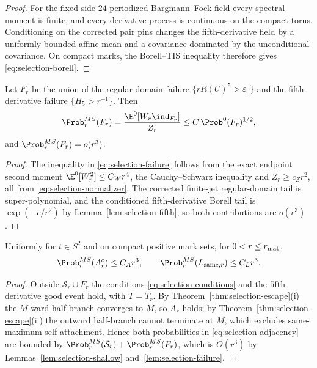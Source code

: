 \begin{proof}
For the fixed side-$24$ periodized Bargmann--Fock field every spectral moment is finite, and every derivative process is continuous on the compact torus. Conditioning on the corrected pair pins changes the fifth-derivative field by a uniformly bounded affine mean and a covariance dominated by the unconditional covariance. On compact marks, the Borell--TIS inequality \cite{AdlerTaylor} therefore gives \eqref{eq:selection-borell}.
\end{proof}

\begin{lemma}\label{lem:selection-failure}
Let $F_r$ be the union of the regular-domain failure $\{rR(U)^5>\varepsilon_0\}$ and the fifth-derivative failure $\{H_5>r^{-1}\}$. Then
\begin{equation}\label{eq:selection-failure}
\Prob^{MS}_r(F_r)=\frac{\E^0[W_r\ind_{F_r}]}{Z_r}\le C\,\Prob^0(F_r)^{1/2},
\end{equation}
and $\Prob^{MS}_r(F_r)=o(r^3)$.
\end{lemma}

\begin{proof}
The inequality in \eqref{eq:selection-failure} follows from the exact endpoint second moment $\E^0[W_r^2]\le C_Wr^4$, the Cauchy--Schwarz inequality and $Z_r\ge c_Zr^2$, all from \eqref{eq:selection-normalizer}. The corrected finite-jet regular-domain tail is super-polynomial, and the conditioned fifth-derivative Borell tail is $\exp(-c/r^2)$ by Lemma~\ref{lem:selection-fifth}, so both contributions are $o(r^3)$.
\end{proof}

\begin{proposition}\label{prop:selection-adjacency}
Uniformly for $t\in S^2$ and on compact positive mark sets, for $0<r\le r_{\rm mat}$,
\begin{equation}\label{eq:selection-adjacency}
\Prob^{MS}_r(A_r^c)\le C_Ar^3,\qquad\Prob^{MS}_r(L_{{\rm same},r})\le C_Lr^3 .
\end{equation}
\end{proposition}

\begin{proof}
Outside $\mathcal S_r\cup F_r$ the conditions \eqref{eq:selection-conditions} and the fifth-derivative good event hold, with $T=T_r$. By Theorem~\ref{thm:selection-escape}(i) the $M$-ward half-branch converges to $M$, so $A_r$ holds; by Theorem~\ref{thm:selection-escape}(ii) the outward half-branch cannot terminate at $M$, which excludes same-maximum self-attachment. Hence both probabilities in \eqref{eq:selection-adjacency} are bounded by $\Prob^{MS}_r(\mathcal S_r)+\Prob^{MS}_r(F_r)$, which is $O(r^3)$ by Lemmas~\ref{lem:selection-shallow} and~\ref{lem:selection-failure}.
\end{proof}

